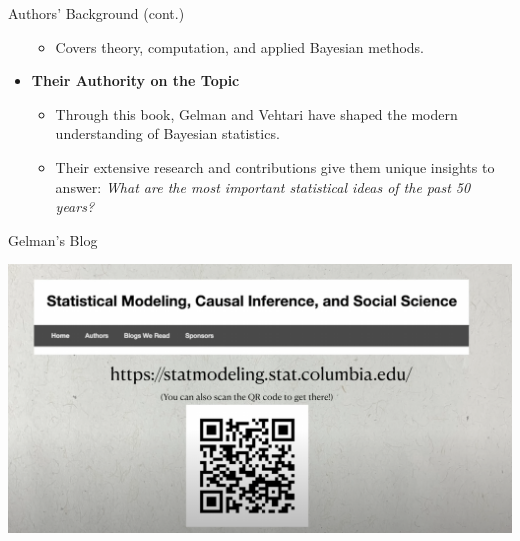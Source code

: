 \documentclass{beamer}
\begin{document}
\begin{frame}{Authors' Background (cont.)}
\begin{minipage}{0.6\textwidth}
\begin{itemize}
\begin{itemize}
            \item Covers theory, computation, and applied Bayesian methods.
        \end{itemize}
        \vspace{0.5em} %
        \item \textbf{Their Authority on the Topic}
        \begin{itemize}
            \item Through this book, Gelman and Vehtari have shaped the modern understanding of Bayesian statistics.
            \item Their extensive research and contributions give them unique insights to answer: \textit{What are the most important statistical ideas of the past 50 years?}
        \end{itemize}
    \end{itemize}
\end{minipage}
\end{frame}



\begin{frame}{Gelman's Blog}
\begin{center}
    \includegraphics[width=\textwidth]{statistical_modeling_blog.png} %
\end{center}
\end{frame}
\end{document}
